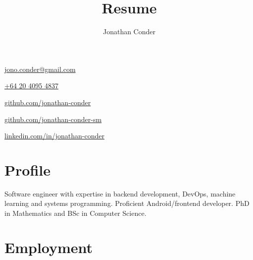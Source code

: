 \documentclass[10pt]{article}
\title{Resume}
\author{Jonathan Conder}
\makeatletter
\newcommand\theemail{jono.conder@gmail.com}
\newcommand\thenumber{+64 20 4095 4837}
\newcommand\thegithub{github.com/jonathan-conder}
\newcommand\thegithubsm{github.com/jonathan-conder-sm}
\newcommand\thelinkedin{linkedin.com/in/jonathan-conder}
\edef\thenumberplain{\thestring}
\makeatother
\begin{document}
\begin{minipage}[t]{0.5\textwidth}
	\begin{iconize}
	\item[\faUser]
		\theauthor
	\item[\faEnvelope]
		\href{mailto:\theemail}{\theemail}
	\item[\faPhone]
		\href{tel:\thenumberplain}{\thenumber}
	\end{iconize}
\end{minipage}
\begin{minipage}[t]{0.5\textwidth}
	\begin{iconize}
	\item[\faGithub]
		\href{https://\thegithub}{\thegithub}
	\item[\faGithub]
		\href{https://\thegithubsm}{\thegithubsm}
	\item[\faLinkedin]
		\href{https://www.\thelinkedin}{\thelinkedin}
	\end{iconize}
\end{minipage}

\section{Profile}

Software engineer with expertise in backend development, DevOps, machine learning and systems programming.
Proficient Android/frontend developer.
PhD in Mathematics and BSc in Computer Science.

\section{Employment}
\end{document}
